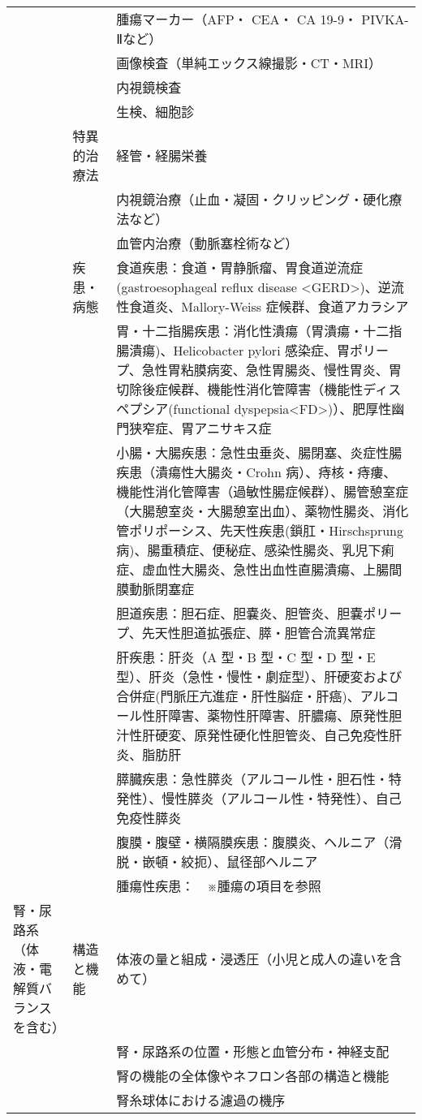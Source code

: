 \begin{xltabular}{\linewidth}{XXX}
 &  & 腫瘍マーカー（AFP・ CEA・ CA 19-9・ PIVKA-Ⅱなど） \\
 &  & 画像検査（単純エックス線撮影・CT・MRI） \\
 &  & 内視鏡検査 \\
 &  & 生検、細胞診 \\
 & 特異的治療法 & 経管・経腸栄養 \\
 &  & 内視鏡治療（止血・凝固・クリッピング・硬化療法など） \\
 &  & 血管内治療（動脈塞栓術など） \\
 & 疾患・病態 & 食道疾患：食道・胃静脈瘤、胃食道逆流症(gastroesophageal reflux disease <GERD>)、逆流性食道炎、Mallory-Weiss 症候群、食道アカラシア \\
 &  & 胃・十二指腸疾患：消化性潰瘍（胃潰瘍・十二指腸潰瘍)、Helicobacter pylori 感染症、胃ポリープ、急性胃粘膜病変、急性胃腸炎、慢性胃炎、胃切除後症候群、機能性消化管障害（機能性ディスペプシア(functional dyspepsia<FD>)）、肥厚性幽門狭窄症、胃アニサキス症 \\
 &  & 小腸・大腸疾患：急性虫垂炎、腸閉塞、炎症性腸疾患（潰瘍性大腸炎・Crohn 病）、痔核・痔瘻、機能性消化管障害（過敏性腸症候群）、腸管憩室症（大腸憩室炎・大腸憩室出血）、薬物性腸炎、消化管ポリポーシス、先天性疾患(鎖肛・Hirschsprung 病)、腸重積症、便秘症、感染性腸炎、乳児下痢症、虚血性大腸炎、急性出血性直腸潰瘍、上腸間膜動脈閉塞症 \\
 &  & 胆道疾患：胆石症、胆嚢炎、胆管炎、胆嚢ポリープ、先天性胆道拡張症、膵・胆管合流異常症 \\
 &  & 肝疾患：肝炎（A 型・B 型・C 型・D 型・E 型）、肝炎（急性・慢性・劇症型）、肝硬変および合併症(門脈圧亢進症・肝性脳症・肝癌)、アルコール性肝障害、薬物性肝障害、肝膿瘍、原発性胆汁性肝硬変、原発性硬化性胆管炎、自己免疫性肝炎、脂肪肝 \\
 &  & 膵臓疾患：急性膵炎（アルコール性・胆石性・特発性）、慢性膵炎（アルコール性・特発性）、自己免疫性膵炎 \\
 &  & 腹膜・腹壁・横隔膜疾患：腹膜炎、ヘルニア（滑脱・嵌頓・絞扼）、鼠径部ヘルニア \\
 &  & 腫瘍性疾患：　※腫瘍の項目を参照 \\
腎・尿路系（体液・電解質バランスを含む） & 構造と機能 & 体液の量と組成・浸透圧（小児と成人の違いを含めて） \\
 &  & 腎・尿路系の位置・形態と血管分布・神経支配 \\
 &  & 腎の機能の全体像やネフロン各部の構造と機能 \\
 &  & 腎糸球体における濾過の機序 \\

\end{xltabular}
